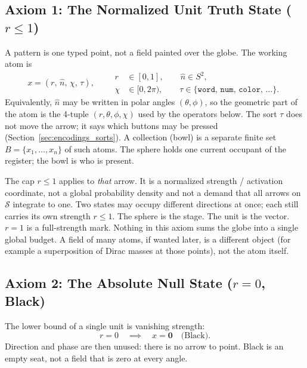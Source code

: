 \documentclass[12pt, a4paper]{article}
\begin{document}
\subsection{Axiom 1: The Normalized Unit Truth State ($r \le 1$)}
\label{subsec:axiom1}
A pattern is one typed point, not a field painted over the globe. The working atom is
\begin{equation}
    x = (r,\,\hat n,\,\chi,\,\tau),
    \qquad
    \begin{aligned}
    r &\in [0,1],
    \qquad
    \hat n \in S^2,\\
    \chi &\in [0,2\pi),
    \qquad
    \tau \in \{\mathtt{word},\,\mathtt{num},\,\mathtt{color},\,\ldots\}.
    \end{aligned}
    \label{eq:unit_truth}
\end{equation}
Equivalently, $\hat n$ may be written in polar angles $(\theta,\phi)$, so the geometric part of the atom is the 4-tuple $(r,\theta,\phi,\chi)$ used by the operators below. The sort $\tau$ does not move the arrow; it says which buttons may be pressed (Section~\ref{sec:encodings_sorts}). A collection (bowl) is a separate finite set $B=\{x_1,\ldots,x_n\}$ of such atoms. The sphere holds one current occupant of the register; the bowl is who is present.

The cap $r \le 1$ applies to \emph{that} arrow. It is a normalized strength / activation coordinate, not a global probability density and not a demand that all arrows on $\mathcal{S}$ integrate to one. Two states may occupy
different directions at once; each still carries its own strength
$r\le 1$. The sphere is the stage. The unit is the vector.
$r=1$ is a full-strength mark. Nothing in this axiom sums the globe
into a single global budget. A field of many atoms, if wanted later, is a different object (for example a superposition of Dirac masses at those points), not the atom itself.

\subsection{Axiom 2: The Absolute Null State ($r = 0$, Black)}
\label{subsec:axiom_null}
The lower bound of a single unit is vanishing strength:
\begin{equation}
    r = 0 \quad \implies \quad x = \mathbf{0}
    \quad \text{(Black)}.
    \label{eq:null_state}
\end{equation}
Direction and phase are then unused: there is no arrow to point.
Black is an empty seat, not a field that is zero at every angle.
\end{document}
